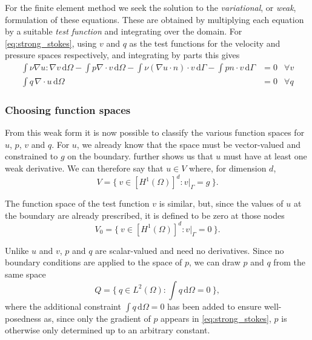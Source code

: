 \documentclass[thesis]{subfiles}
\begin{document}
For the finite element method we seek the solution to the \emph{variational}, or \emph{weak}, formulation of these equations.
These are obtained by multiplying each equation by a suitable \emph{test function} and integrating over the domain.
For \cref{eq:strong_stokes}, using $v$ and $q$ as the test functions for the velocity and pressure spaces respectively, and integrating by parts this gives
\begin{equation} \label{eq:weak_stokes_full}
  \begin{aligned}
    \int \nu \nabla u : \nabla v \, \textrm{d}\Omega
    - \int p \nabla \cdot v \, \textrm{d}\Omega
    - \int \nu (\nabla u \cdot n) \cdot v \, \textrm{d}\Gamma
    - \int p n \cdot v \, \textrm{d}\Gamma
    &= 0
    &\forall v
    \\
    \int q \, \nabla \cdot u \, \textrm{d}\Omega
    &= 0
    &\forall q
  \end{aligned}
\end{equation}

\subsubsection{Choosing function spaces}

From this weak form it is now possible to classify the various function spaces for $u$, $p$, $v$ and $q$.
For $u$, we already know that the space must be vector-valued and constrained to $g$ on the boundary.
 further shows us that $u$ must have at least one weak derivative.
We can therefore say that $u \in V$ where, for dimension $d$,
\begin{equation}
  V = \{ \ v \in [H^1(\Omega)]^d : v |_{\Gamma} = g \ \}.
\end{equation}

The function space of the test function $v$ is similar, but, since the values of $u$ at the boundary are already prescribed, it is defined to be zero at those nodes
\begin{equation} \label{eq:vspace}
  V_0 = \{\ v \in [H^1(\Omega)]^d : v|_{\Gamma} = 0 \ \}.
\end{equation}

Unlike $u$ and $v$, $p$ and $q$ are scalar-valued and need no derivatives.
Since no boundary conditions are applied to the space of $p$, we can draw $p$ and $q$ from the same space
\begin{equation}
  Q = \{ \ q \in L^2(\Omega) : \int q \, \textrm{d}\Omega = 0 \ \},
  \label{eq:stokes_pressure_space}
\end{equation}
where the additional constraint $\int q \, \textrm{d}\Omega = 0$ has been added to ensure well-posedness as, since only the gradient of $p$ appears in \cref{eq:strong_stokes}, $p$ is otherwise only determined up to an arbitrary constant.
\end{document}
